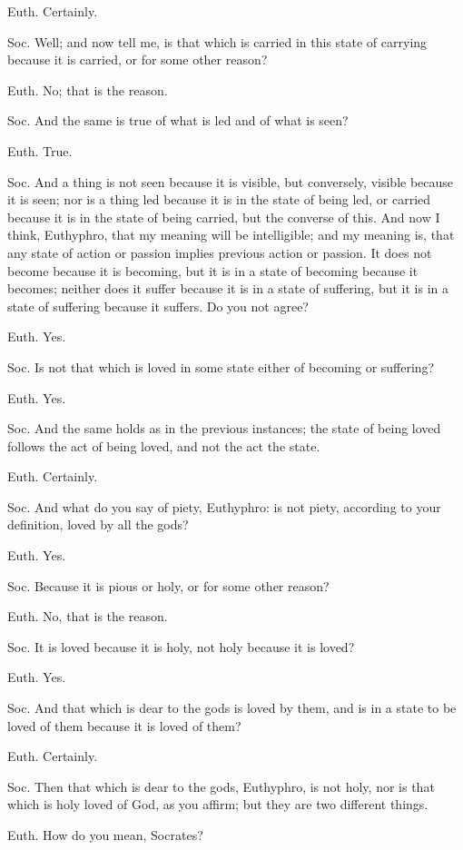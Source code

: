 Euth. Certainly.

Soc. Well; and now tell me, is that which is carried in this state of carrying because it is carried, or for some other reason?

Euth. No; that is the reason.

Soc. And the same is true of what is led and of what is seen?

Euth. True.

Soc. And a thing is not seen because it is visible, but conversely, visible because it is seen; nor is a thing led because it is in the state of being led, or carried because it is in the state of being carried, but the converse of this. And now I think, Euthyphro, that my meaning will be intelligible; and my meaning is, that any state of action or passion implies previous action or passion. It does not become because it is becoming, but it is in a state of becoming because it becomes; neither does it suffer because it is in a state of suffering, but it is in a state of suffering because it suffers. Do you not agree?

Euth. Yes.

Soc. Is not that which is loved in some state either of becoming or suffering?

Euth. Yes.

Soc. And the same holds as in the previous instances; the state of being loved follows the act of being loved, and not the act the state.

Euth. Certainly.

Soc. And what do you say of piety, Euthyphro: is not piety, according to your definition, loved by all the gods?

Euth. Yes.

Soc. Because it is pious or holy, or for some other reason?

Euth. No, that is the reason.

Soc. It is loved because it is holy, not holy because it is loved?

Euth. Yes.

Soc. And that which is dear to the gods is loved by them, and is in a state to be loved of them because it is loved of them?

Euth. Certainly.

Soc. Then that which is dear to the gods, Euthyphro, is not holy, nor is that which is holy loved of God, as you affirm; but they are two different things.

Euth. How do you mean, Socrates?

